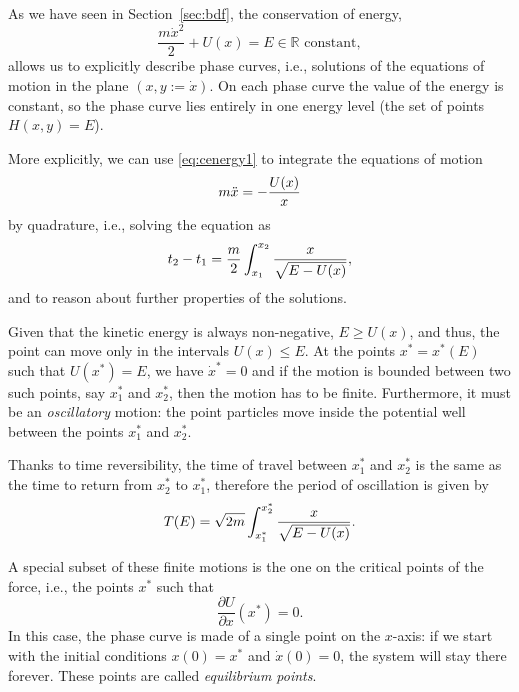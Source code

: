 \documentclass[english,fontsize=11pt,paper=a5,oneside]{scrbook}
\newcommand{\R}{\mathbb{R}}
\let\d\relax
\DeclareMathOperator{\d}{d}
\theoremstyle{definition}
\begin{document}
As we have seen in Section~\ref{sec:bdf}, the conservation of energy,
\begin{equation}\label{eq:cenergy1}
    \frac{m \dot x^2}{2} + U(x) = E \in\R \mbox{ constant},
\end{equation}
allows us to explicitly describe phase curves, i.e., solutions of the equations of motion in the plane $(x, y := \dot x)$.
On each phase curve the value of the energy is constant, so the phase curve lies entirely in one energy level (the set of points $H(x,y)=E$).

More explicitly, we can use \eqref{eq:cenergy1} to integrate the equations of motion
\begin{equation}
    m \ddot x = - \frac{\d U(x)}{\d x}
\end{equation}
by quadrature, i.e., solving the equation as
\begin{equation}
    t_2 - t_1 = \frac m2 \int_{x_1}^{x_2} \frac{\d x}{\sqrt{E-U(x)}},
\end{equation}
and to reason about further properties of the solutions.

Given that the kinetic energy is always non-negative, $E \geq U(x)$, and thus, the point can move only in the intervals $U(x) \leq E$.
At the points $x^* = x^*(E)$ such that $U(x^*) = E$, we have $\dot x^* = 0$ and if the motion is bounded between two such points, say $x_1^*$ and $x_2^*$, then the motion has to be finite.
Furthermore, it must be an \emph{oscillatory} motion: the point particles move inside the potential well between the points $x_1^*$ and $x_2^*$.

Thanks to time reversibility, the time of travel between $x_1^*$ and $x_2^*$ is the same as the time to return from $x_2^*$ to $x_1^*$, therefore the period of oscillation is given by
\begin{equation}\label{eq:osc}
    T(E) = \sqrt{2m} \int_{x^*_1}^{x^*_2} \frac{\d x}{\sqrt{E-U(x)}}.
\end{equation}

A special subset of these finite motions is the one on the critical points of the force, i.e., the points $x^*$ such that 
\begin{equation}
    \frac{\partial U}{\partial x}(x^*) = 0.
\end{equation}
In this case, the phase curve is made of a single point on the $x$-axis: if we start with the initial conditions $x(0) = x^*$ and $\dot x(0) = 0$, the system will stay there forever. These points are called \emph{equilibrium points}.
\end{document}
